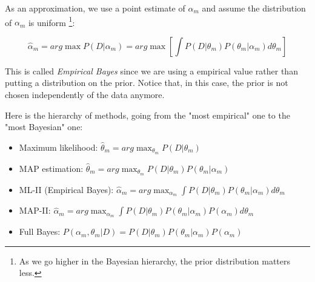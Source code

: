 \documentclass[11pt,letterpaper]{article}
\theoremstyle{definition}
\newcommand{\prior}{\alpha_m}
\newcommand{\param}{\theta_m}
\begin{document}
As an approximation, we use a point estimate of $\alpha_m$ and assume the distribution of $\alpha_m$ is uniform \footnote{As we go higher in the Bayesian hierarchy, the prior distribution matters less.}:

$$ \hat{\alpha}_m = arg\max P(D|\prior) = arg\max \left[ \int P(D|\param)P(\param|\prior)d\param \right] $$

This is called \emph{Empirical Bayes} since we are using a empirical value rather than putting a distribution on the prior. Notice that, in this case, the prior is not chosen independently of the data anymore. 

Here is the hierarchy of methods, going from the "most empirical" one to the "most Bayesian" one:

\begin{itemize}
\item Maximum likelihood: $\hat{\theta}_m = arg\max_{\param}P(D | \param)$
\item MAP estimation: $\hat{\theta}_m = arg\max_{\param}P(D|\param)P(\param|\prior)$
\item ML-II (Empirical Bayes): $\hat{\alpha}_m = arg\max_{\prior} \int P(D | \param)P(\param | \prior) d\param$
\item MAP-II: $\hat{\alpha}_m = arg\max_{\prior} \int P(D | \param) P(\param|\prior)P(\prior) d\param$
\item Full Bayes: $P(\prior, \param | D) = P(D | \param)P(\param | \prior)P(\prior)$
\end{itemize}
\end{document}
